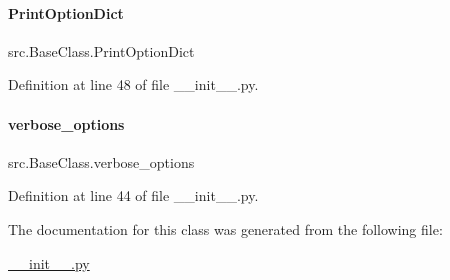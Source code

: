 \paragraph{\texorpdfstring{Print\+Option\+Dict}{PrintOptionDict}}
{\footnotesize\ttfamily src.\+Base\+Class.\+Print\+Option\+Dict}



Definition at line 48 of file \+\_\+\+\_\+init\+\_\+\+\_\+.\+py.

\mbox{\label{classsrc_1_1BaseClass_a967db6032b17a0d0090dfee599d62612}} 
\paragraph{\texorpdfstring{verbose\+\_\+options}{verbose\_options}}
{\footnotesize\ttfamily src.\+Base\+Class.\+verbose\+\_\+options}



Definition at line 44 of file \+\_\+\+\_\+init\+\_\+\+\_\+.\+py.



The documentation for this class was generated from the following file\+:\begin{DoxyCompactItemize}
\item 
\hyperlink{____init_____8py}{\+\_\+\+\_\+init\+\_\+\+\_\+.\+py}\end{DoxyCompactItemize}
